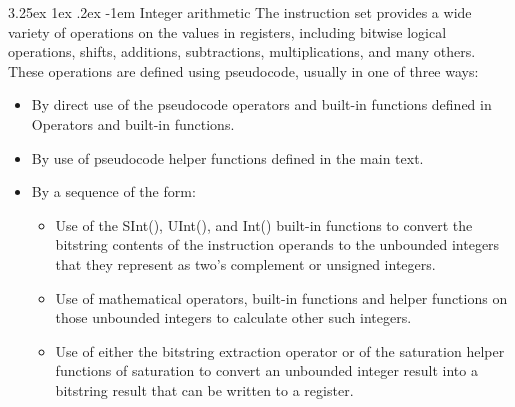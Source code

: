 \documentclass{report}
\makeatletter
\renewcommand\paragraph{\@startsection{paragraph}{5}{\z@}%
	{3.25ex \@plus1ex \@minus.2ex}%
	{-1em}%
	{\normalfont\normalsize\bfseries}}
\makeatother
\begin{document}
		\paragraph{Integer arithmetic} The instruction set provides a wide variety of operations on the values in registers, including bitwise logical operations, shifts, additions, subtractions, multiplications, and many others. These operations are defined using pseudocode, usually in one of three ways:
		\begin{itemize}
			\item By direct use of the pseudocode operators and built-in functions defined in Operators and built-in functions.
			\item By use of pseudocode helper functions defined in the main text.
			\item By a sequence of the form:
			\begin{itemize}
				\item Use of the SInt(), UInt(), and Int() built-in functions to convert the bitstring contents of the instruction operands to the unbounded integers that they represent as two's complement or unsigned integers.
				\item Use of mathematical operators, built-in functions and helper functions on those unbounded integers to calculate other such integers.
				\item Use of either the bitstring extraction operator or of the saturation helper functions of saturation to convert an unbounded integer result into a bitstring result that can be written to a register.
			\end{itemize}
		\end{itemize}
		
\end{document}
